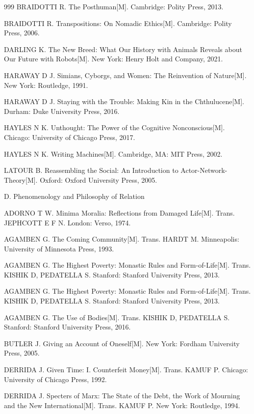 \begin{thebibliography}{999}
\bibitem{} BRAIDOTTI R. The Posthuman[M]. Cambridge: Polity Press, 2013.

\bibitem{} BRAIDOTTI R. Transpositions: On Nomadic Ethics[M]. Cambridge: Polity Press, 2006.

\bibitem{} DARLING K. The New Breed: What Our History with Animals Reveals about Our Future with Robots[M]. New York: Henry Holt and Company, 2021.

\bibitem{} HARAWAY D J. Simians, Cyborgs, and Women: The Reinvention of Nature[M]. New York: Routledge, 1991.

\bibitem{} HARAWAY D J. Staying with the Trouble: Making Kin in the Chthulucene[M]. Durham: Duke University Press, 2016.

\bibitem{} HAYLES N K. Unthought: The Power of the Cognitive Nonconscious[M]. Chicago: University of Chicago Press, 2017.

\bibitem{} HAYLES N K. Writing Machines[M]. Cambridge, MA: MIT Press, 2002.

\bibitem{} LATOUR B. Reassembling the Social: An Introduction to Actor-Network-Theory[M]. Oxford: Oxford University Press, 2005.

\bibitem{} D. Phenomenology and Philosophy of Relation

\bibitem{} ADORNO T W. Minima Moralia: Reflections from Damaged Life[M]. Trans. JEPHCOTT E F N. London: Verso, 1974.

\bibitem{} AGAMBEN G. The Coming Community[M]. Trans. HARDT M. Minneapolis: University of Minnesota Press, 1993.

\bibitem{} AGAMBEN G. The Highest Poverty: Monastic Rules and Form-of-Life[M]. Trans. KISHIK D, PEDATELLA S. Stanford: Stanford University Press, 2013.

\bibitem{} AGAMBEN G. The Highest Poverty: Monastic Rules and Form-of-Life[M]. Trans. KISHIK D, PEDATELLA S. Stanford: Stanford University Press, 2013.

\bibitem{} AGAMBEN G. The Use of Bodies[M]. Trans. KISHIK D, PEDATELLA S. Stanford: Stanford University Press, 2016.

\bibitem{} BUTLER J. Giving an Account of Oneself[M]. New York: Fordham University Press, 2005.

\bibitem{} DERRIDA J. Given Time: I. Counterfeit Money[M]. Trans. KAMUF P. Chicago: University of Chicago Press, 1992.

\bibitem{} DERRIDA J. Specters of Marx: The State of the Debt, the Work of Mourning and the New International[M]. Trans. KAMUF P. New York: Routledge, 1994.


\end{thebibliography}

